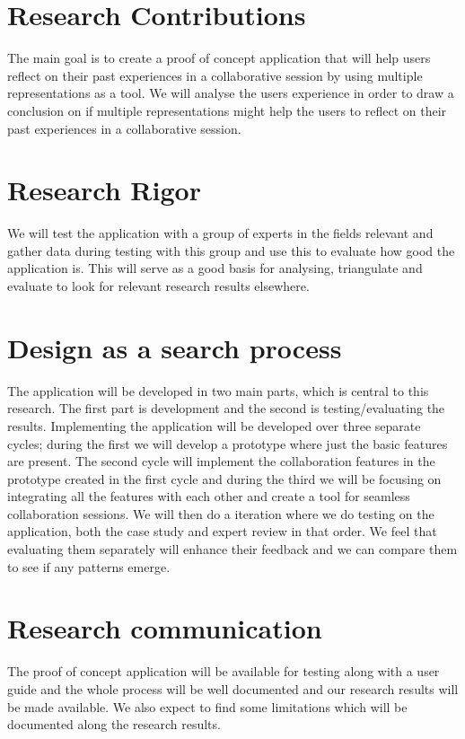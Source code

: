 \section{Research Contributions}
The main goal is to create a proof of concept application that will help users reflect on their past experiences in a collaborative session by using multiple representations as a tool. 
We will analyse the users experience in order to draw a conclusion on if multiple representations might help the users to reflect on their past experiences in a collaborative session.
\section{Research Rigor}
 We will test the application with a group of experts in the fields relevant and gather data during testing with this group and use this to evaluate how good the application is. This will serve as a good basis for analysing, triangulate and evaluate to look for relevant research results elsewhere.
\section{Design as a search process}
The application will be developed in two main parts, which is central to this research. The first part is development and the second is testing/evaluating the results.
Implementing the application will be developed over three separate cycles; during the first we will develop a prototype where just the basic features are present. The second cycle will implement the collaboration features in the prototype created in the first cycle and during the third we will be focusing on integrating all the features with each other and create a tool for seamless collaboration sessions.
We will then do a iteration where we do testing on the application, both the case study and expert review in that order. We feel that evaluating them separately will enhance their feedback and we can compare them to see if any patterns emerge.
\section{Research communication}
The proof of concept application will be available for testing along with a user guide and the whole process will be well documented and our research results will be made available.
We also expect to find some limitations which will be documented along the research results.